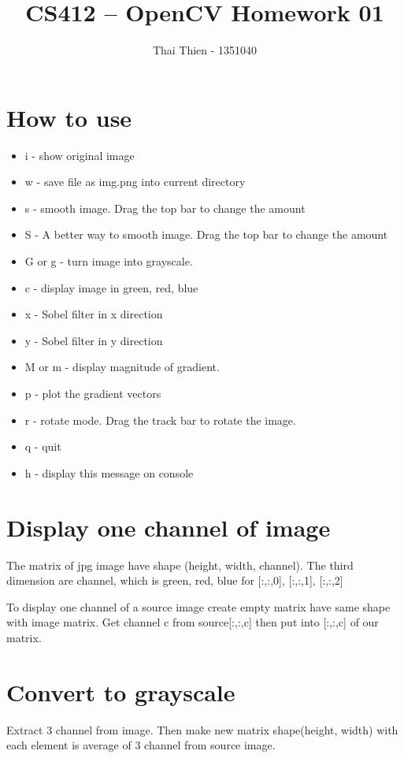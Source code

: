\documentclass[]{article}
\title{CS412 -- OpenCV Homework 01}
\author{Thai Thien - 1351040}
\begin{document}
\maketitle

\section{How to use}
\begin{itemize}
	\item i - show original image
	\item w - save file as img.png into current directory
	\item s - smooth image. Drag the top bar to change the amount
	\item S - A better way to smooth image. Drag the top bar to change the amount
	\item G or g - turn image into grayscale.
	\item c - display image in green, red, blue
	\item x - Sobel filter in x direction
	\item y - Sobel filter in y direction
	\item M or m - display magnitude of gradient. 
	\item p - plot the gradient vectors
	\item r - rotate mode. Drag the track bar to rotate the image.
	\item q - quit
	\item h - display this message on console
\end{itemize}

\section{Display one channel of image}
The matrix of jpg image have shape (height, width, channel). The third dimension are channel, which is green, red, blue for [:,:,0], [:,:,1], [:,:,2]

To display one channel of a source image create empty matrix have same shape with image matrix. Get channel c from source[:,:,c] then put into [:,:,c] of our matrix.  

\section{Convert to grayscale}
Extract 3 channel from image. Then make new matrix shape(height, width) with each element is average of 3 channel from source image.
\end{document}
